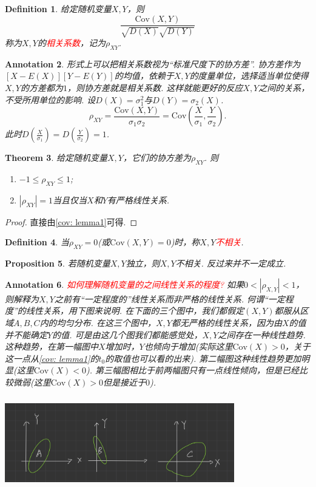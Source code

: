 \documentclass{article}
\newtheorem{theorem}{Theorem}[section]
\newtheorem{proposition}[theorem]{Proposition}
\newtheorem{definition}[theorem]{Definition}
\newtheorem{annotation}[theorem]{Annotation}
\newcommand{\redt}[1]{\textcolor{red}{#1}}
\begin{document}
\begin{definition}
\rm 给定随机变量$X,Y$，则
$$
\frac{\text{Cov}(X,Y)}{\sqrt{D(X)}\sqrt{D(Y)}}
$$
称为$X,Y$的\redt{相关系数}，记为$\rho_{XY}$.
\end{definition}

\begin{annotation}
\rm 形式上可以把相关系数视为“标准尺度下的协方差”. 协方差作为$[X-E(X)][Y-E(Y)]$的均值，依赖于$X,Y$的度量单位，选择适当单位使得$X,Y$的方差都为$1$，则协方差就是相关系数. 这样就能更好的反应$X,Y$之间的关系，不受所用单位的影响. 设$D(X)=\sigma_1^2$与$D(Y)=\sigma_2(X)$.
$$
\rho_{XY}=\frac{\text{Cov}(X,Y)}{\sigma_1\sigma_2} = \text{Cov}(\frac{X}{\sigma_1},\frac{Y}{\sigma_2}).
$$
此时$D(\frac{X}{\sigma_1})=D(\frac{Y}{\sigma_2}) = 1$.
\end{annotation}

\begin{theorem}
\rm 给定随机变量$X,Y$，它们的协方差为$\rho_{XY}$. 则
\begin{enumerate}
	\item $ -1 \leq \rho_{XY} \leq 1$;
	\item $|\rho_{XY}| = 1$当且仅当$X$和$Y$有严格线性关系. 
\end{enumerate} 
\end{theorem}

\begin{proof}
直接由\ref{cov: lemma1}可得.
\end{proof}

\begin{definition}
\rm 当$\rho_{XY}=0$(或$\text{Cov}(X,Y)=0$)时，称$X,Y$\redt{不相关}.
\end{definition}

\begin{proposition}
\rm 若随机变量$X,Y$独立，则$X,Y$不相关. 反过来并不一定成立. 
\end{proposition}

\begin{annotation}
\rm \redt{如何理解随机变量的之间线性关系的程度?} 如果$0 < |\rho_{X,Y}| < 1$，则解释为$X,Y$之前有“一定程度的”线性关系而非严格的线性关系. 何谓“一定程度”的线性关系，用下图来说明. 在下面的三个图中，我们都假定$(X,Y)$都服从区域$A,B,C$内的均匀分布. 在这三个图中，$X,Y$都无严格的线性关系，因为由$X$的值并不能确定$Y$的值. 可是由这几个图我们都能感觉处，$X,Y$之间存在一种线性趋势. 这种趋势，在第一幅图中$X$增加时，$Y$也倾向于增加(实际这里$\text{Cov}(X)>0$，关于这一点从\ref{cov: lemma1}的$t_0$的取值也可以看的出来). 第二幅图这种线性趋势更加明显(这里$\text{Cov}(X) < 0$). 第三幅图相比于前两幅图只有一点线性倾向，但是已经比较微弱(这里$\text{Cov}(X)>0$但是接近于$0$). 
\begin{center}
\includegraphics[width=10cm, height=4cm]{images/covariance.jpg}
\end{center}
\end{annotation}
\end{document}
